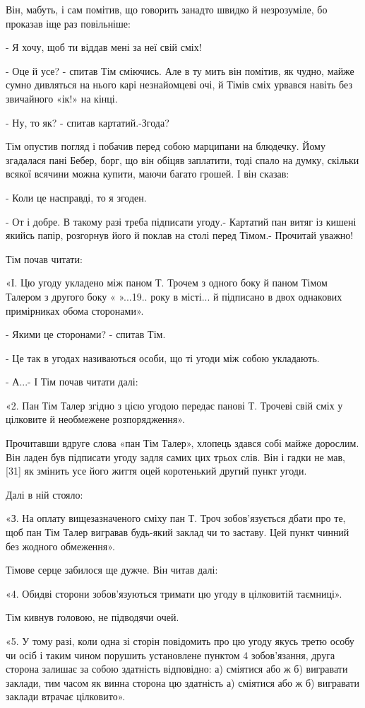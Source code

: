 Він, мабуть, і сам помітив, що говорить занадто швидко й незрозуміле, бо проказав іще раз повільніше:

- Я хочу, щоб ти віддав мені за неї свій сміх!

- Оце й усе? - спитав Тім сміючись. Але в ту мить він помітив, як чудно, майже сумно дивляться на нього карі незнайомцеві очі, й Тімів сміх урвався навіть без звичайного «ік!» на кінці.

- Ну, то як? - спитав картатий.-Згода?

Тім опустив погляд і побачив перед собою марципани на блюдечку. Йому згадалася пані Бебер, борг, що він обіцяв заплатити, тоді спало на думку, скільки всякої всячини можна купити, маючи багато грошей. І він сказав:

- Коли це насправді, то я згоден.

- От і добре. В такому разі треба підписати угоду.- Картатий пан витяг із кишені якийсь папір, розгорнув його й поклав на столі перед Тімом.- Прочитай уважно!

Тім почав читати:

«І. Цю угоду укладено між паном Т. Трочем з одного боку й паном Тімом Талером з другого боку « »...19.. року в місті... й підписано в двох однакових примірниках обома сторонами».

- Якими це сторонами? - спитав Тім.

- Це так в угодах називаються особи, що ті угоди між собою укладають.

- А...- І Тім почав читати далі:

«2. Пан Тім Талер згідно з цією угодою передає панові Т. Трочеві свій сміх у цілковите й необмежене розпорядження».

Прочитавши вдруге слова «пан Тім Талер», хлопець здався собі майже дорослим. Він ладен був підписати угоду задля самих цих трьох слів. Він і гадки не мав, [31] як змінить усе його життя оцей коротенький другий пункт угоди.

Далі в ній стояло:

«З. На оплату вищезазначеного сміху пан Т. Троч зобов'язується дбати про те, щоб пан Тім Талер вигравав будь-який заклад чи то заставу. Цей пункт чинний без жодного обмеження».

Тімове серце забилося ще дужче. Він читав далі:

«4. Обидві сторони зобов'язуються тримати цю угоду в цілковитій таємниці».

Тім кивнув головою, не підводячи очей.

«5. У тому разі, коли одна зі сторін повідомить про цю угоду якусь третю особу чи осіб і таким чином порушить установлене пунктом 4 зобов'язання, друга сторона залишає за собою здатність відповідно: а) сміятися або ж б) вигравати заклади, тим часом як винна сторона цю здатність а) сміятися або ж б) вигравати заклади втрачає цілковито».

